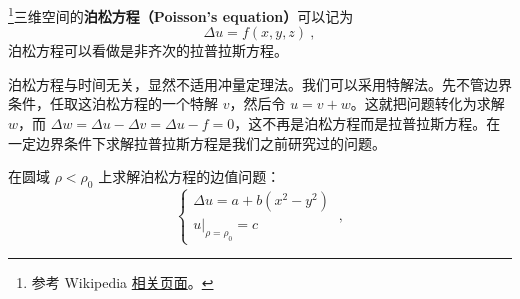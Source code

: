 

\footnote{参考 Wikipedia \href{https://en.wikipedia.org/wiki/Poisson's_equation}{相关页面}。}三维空间的\textbf{泊松方程（Poisson's equation）}可以记为
\begin{equation}
\Delta u=f(x, y, z)~,
\end{equation}
泊松方程可以看做是非齐次的拉普拉斯方程。

泊松方程与时间无关，显然不适用冲量定理法。我们可以采用特解法。先不管边界条件，任取这泊松方程的一个特解 $v$，然后令 $u=v+w$。这就把问题转化为求解 $w$，而 $\Delta w=\Delta u-\Delta v=\Delta u-f=0$，这不再是泊松方程而是拉普拉斯方程。在一定边界条件下求解拉普拉斯方程是我们之前研究过的问题。

\begin{example}{}
在圆域 $\rho<\rho_0$ 上求解泊松方程的边值问题：
\begin{equation}
\left\{\begin{array}{l}\Delta u=a+b\left(x^{2}-y^{2}\right) \\ \left.u\right|_{\rho=\rho_{0}}=c\end{array}~,\right.
\end{equation}


\end{example}
